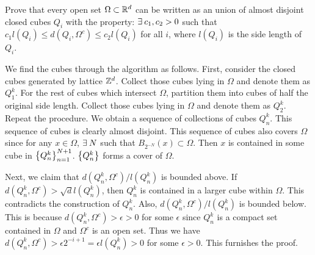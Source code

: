 \begin{problem}
    Prove that every open set $\Omega\subset\mathbb{R}^d$ can be 
    written as an union of almost disjoint closed cubes 
    $Q_i$ with the property: $\exists\: c_1,c_2>0$ such that 
    $c_1 l(Q_i)\leq d(Q_i,\Omega^c)\leq c_2 l(Q_i)$ for all 
    $i$, where $l(Q_i)$ is the side length of $Q_i$.
\end{problem}
\begin{pf}
    We find the cubes through the algorithm as follows. 
    First, consider the closed cubes generated by lattice 
    $\mathbb{Z}^d$. Collect those cubes lying in $\Omega$ and denote 
    them as $Q_1^k$. For the rest of cubes which intersect 
    $\Omega$, partition them into cubes of half the original 
    side length. Collect those cubes lying in $\Omega$ and 
    denote them as $Q_2^k$. Repeat the procedure. We 
    obtain a sequence of collections of cubes $Q_n^k$. 
    This sequence of cubes is clearly almost disjoint. This 
    sequence of cubes also covers $\Omega$ since for any 
    $x\in\Omega$, $\exists\: N$ such that $B_{2^{-N}}(x)\subset 
    \Omega$. Then $x$ is contained in some cube in 
    $\left\{ {Q_n^k} \right\}_{n=1}^{N+1}$. $\left\{ {Q_n^k} \right\}$ forms a cover of 
    $\Omega$. 

    Next, we claim that $d(Q_n^k,\Omega^c)/l(Q_n^k)$ is 
    bounded above. If $d(Q_n^k,\Omega^c)>\sqrt{d}l(Q_n^k)$, 
    then $Q_n^k$ is contained in a larger cube within $\Omega$. 
    This contradicts the construction of $Q_n^k$. Also, 
    $d(Q_n^k,\Omega^c)/l(Q_n^k)$ is bounded below. This is 
    because $d(Q_n^k,\Omega^c)>\epsilon>0$ for some $\epsilon$ 
    since $Q_n^k$ is a compact set contained in $\Omega$ and 
    $\Omega^c$ is an open set. Thus we have $d(Q_n^k,\Omega^c)
    >\epsilon 2^{-i+1} = \epsilon l(Q_n^k)>0$ for some 
    $\epsilon>0$. This furnishes the proof.   
\end{pf}

